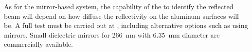 As for the mirror-based system, the capability of the  to identify the reflected beam will depend on how diffuse the reflectivity on the aluminum surfaces will be. A full test must be carried out at , including alternative options such as using mirrors. Small dielectric mirrors for \SI{266}{\nano\m} with \SI{6.35}{\milli\m} diameter are commercially available.

















